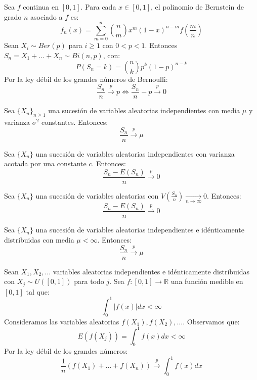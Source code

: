 \begin{example}
    Sea $f$ continua en $[0, 1]$.
    Para cada $x \in [0, 1]$, el polinomio de Bernstein de grado $n$ asociado a $f$ es:
    $$f_n(x) = \sum_{m=0}^n \binom{n}{m}x^m(1-x)^{n-m}f\left(\frac{m}{n}\right)$$
    Sean $X_i \sim Ber(p)$ para $i \geq 1$ con $0 < p < 1$.
    Entonces $S_n = X_1 + \dots + X_n \sim Bi(n, p)$, con:
    $$P(S_n = k) = \binom{n}{k}p^k(1-p)^{n-k}$$
    Por la ley débil de los grandes números de Bernoulli:
    $$\frac{S_n}{n} \xrightarrow{p} p \Leftrightarrow \frac{S_n}{n} - p \xrightarrow{p} 0$$
\end{example}

\begin{theorem}[Chebyshev]
    Sea $\{X_n\}_{n \geq 1}$ una sucesión de variables aleatorias independientes con media $\mu$ y varianza $\sigma^2$ constantes.
    Entonces:
    $$\frac{S_n}{n} \xrightarrow{p} \mu$$
\end{theorem}

\begin{theorem}[Chebyshev]
    Sea $\{X_n\}$ una sucesión de variables aleatorias independientes con varianza acotada por una constante $c$.
    Entonces:
    $$\frac{S_n - E(S_n)}{n} \xrightarrow{p} 0$$
\end{theorem}

\begin{theorem}[Márkov]
    Sea $\{X_n\}$ una sucesión de variables aleatorias con $V\left(\frac{S_n}{n}\right) \xrightarrow[n \to \infty]{} 0$.
    Entonces:
    $$\frac{S_n - E(S_n)}{n} \xrightarrow{p} 0$$
\end{theorem}

\begin{theorem}[Khinchin]
    Sea $\{X_n\}$ una sucesión de variables aleatorias independientes e idénticamente distribuidas con media $\mu < \infty$.
    Entonces:
    $$\frac{S_n}{n} \xrightarrow{p} \mu$$
\end{theorem}

\begin{example}
    Sean $X_1, X_2, \dots$ variables aleatorias independientes e idénticamente distribuidas con $X_j \sim U([0, 1])$ para todo $j$.
    Sea $f: [0, 1] \to \mathbb{R}$ una función medible en $[0, 1]$ tal que:
    $$\int_0^1 |f(x)|dx < \infty$$
    Consideramos las variables aleatorias $f(X_1), f(X_2), \dots$.
    Observamos que:
    $$E(f(X_j)) = \int_0^1 f(x)dx < \infty$$
    Por la ley débil de los grandes números:
    $$\frac{1}{n}(f(X_1) + \dots + f(X_n)) \xrightarrow{p} \int_0^1 f(x)dx$$
\end{example}

